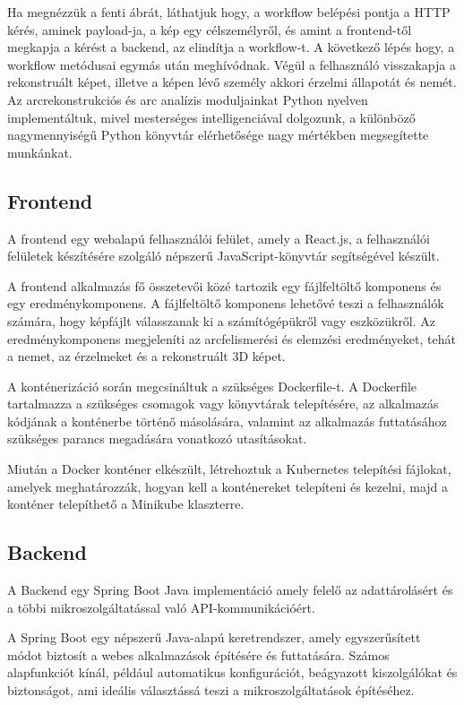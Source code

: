 \documentclass[12pt,a4]{article}
\begin{document}
        	Ha megnézzük a fenti ábrát, láthatjuk hogy, a workflow belépési pontja a HTTP kérés, aminek payload-ja, a kép egy célszemélyről, és amint a
        	frontend-től megkapja a kérést a backend, az elindítja a workflow-t. A következő lépés hogy, a workflow metódusai egymás után meghívódnak.
        	Végül a felhasználó visszakapja a rekonstruált képet, illetve a képen lévő személy akkori érzelmi állapotát és nemét. Az arcrekonstrukciós és arc analízis moduljainkat Python nyelven implementáltuk, mivel mesterséges intelligenciával dolgozunk, a különböző nagymennyiségű Python könyvtár elérhetősége nagy mértékben megsegítette munkánkat.
        
        \subsection{Frontend}

            A frontend egy webalapú felhasználói felület, amely a React.js, a felhasználói felületek készítésére szolgáló népszerű JavaScript-könyvtár segítségével készült.

            A frontend alkalmazás fő összetevői közé tartozik egy fájlfeltöltő komponens és egy eredménykomponens. A fájlfeltöltő komponens lehetővé teszi a felhasználók számára, hogy képfájlt válasszanak ki a számítógépükről vagy eszközükről. Az eredménykomponens megjeleníti az arcfelismerési és elemzési eredményeket, tehát a nemet, az érzelmeket és a rekonstruált 3D képet.

            A konténerizáció során megcsináltuk a szükséges Dockerfile-t. A Dockerfile tartalmazza a szükséges csomagok vagy könyvtárak telepítésére, az alkalmazás kódjának a konténerbe történő másolására, valamint az alkalmazás futtatásához szükséges parancs megadására vonatkozó utasításokat. 

            Miután a Docker konténer elkészült, létrehoztuk a Kubernetes telepítési fájlokat, amelyek meghatározzák, hogyan kell a konténereket telepíteni és kezelni, majd a konténer telepíthető a Minikube klaszterre.
            
        \subsection{Backend}

            A Backend egy Spring Boot Java implementáció amely felelő az adattárolásért és a többi mikroszolgáltatással való API-kommunikációért.

            A Spring Boot egy népszerű Java-alapú keretrendszer, amely egyszerűsített módot biztosít a webes alkalmazások építésére és futtatására. Számos alapfunkciót kínál, például automatikus konfigurációt, beágyazott kiszolgálókat és biztonságot, ami ideális választássá teszi a mikroszolgáltatások építéséhez.
            
\end{document}
